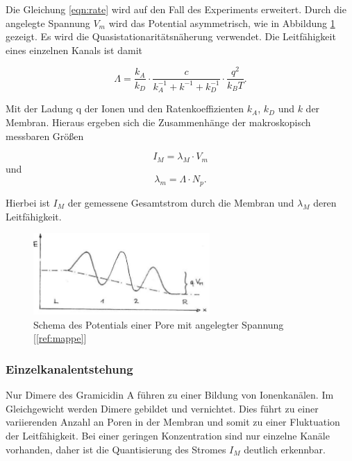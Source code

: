\documentclass[a4paper,ngerman]{scrartcl}
\begin{document}
Die Gleichung \ref{eqn:rate} wird auf den Fall des Experiments erweitert. Durch die angelegte Spannung $V_{m}$ wird das Potential asymmetrisch, wie in Abbildung \ref{fig:potential-asym} gezeigt.  Es wird die Quasistationaritätsnäherung verwendet. Die Leitfähigkeit eines einzelnen Kanals ist damit

\begin{equation}
\Lambda = \frac{k_A}{k_D} \cdot \frac{c}{k_A^{-1}+k^{-1}+k_D^{-1}} \cdot  \frac{q^2}{k_B T} .
\end{equation}

Mit der Ladung q der Ionen und den Ratenkoeffizienten $k_A$, $k_D$ und $k$ der Membran.
Hieraus ergeben sich die Zusammenhänge der makroskopisch messbaren Größen

\begin{equation}
I_M = \lambda_M \cdot V_m
\end{equation}
und
\begin{equation}\label{eqn:transport-leitfaehigkeit}
\lambda_m = \Lambda \cdot N_p.
\end{equation}

Hierbei ist $I_M$ der gemessene Gesamtstrom durch die Membran und $\lambda_M$ deren Leitfähigkeit.


\begin{figure}
\includegraphics[width=0.6\textwidth]{abbildungen/potential-asym.png}
\caption{Schema des Potentials einer Pore mit angelegter Spannung [\ref{ref:mappe}]}
\label{fig:potential-asym}
\end{figure}



\subsubsection{Einzelkanalentstehung}

Nur Dimere des Gramicidin A führen zu einer Bildung von Ionenkanälen. Im Gleichgewicht werden Dimere gebildet und vernichtet. Dies führt zu einer variierenden Anzahl an Poren in der Membran und somit zu einer Fluktuation der Leitfähigkeit. Bei einer geringen Konzentration sind nur einzelne Kanäle vorhanden, daher ist die Quantisierung des Stromes $I_M$ deutlich erkennbar.
\end{document}
